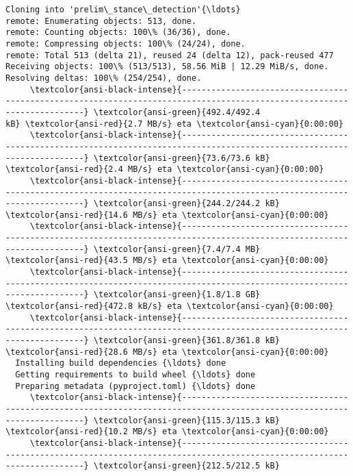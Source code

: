 \documentclass[11pt]{article}
\begin{document}
    \begin{Verbatim}[commandchars=\\\{\}]
Cloning into 'prelim\_stance\_detection'{\ldots}
remote: Enumerating objects: 513, done.
remote: Counting objects: 100\% (36/36), done.
remote: Compressing objects: 100\% (24/24), done.
remote: Total 513 (delta 21), reused 24 (delta 12), pack-reused 477
Receiving objects: 100\% (513/513), 58.56 MiB | 12.29 MiB/s, done.
Resolving deltas: 100\% (254/254), done.
     \textcolor{ansi-black-intense}{------------------------------------------------------------------------------------------------------------------------} \textcolor{ansi-green}{492.4/492.4
kB} \textcolor{ansi-red}{2.7 MB/s} eta \textcolor{ansi-cyan}{0:00:00}
     \textcolor{ansi-black-intense}{------------------------------------------------------------------------------------------------------------------------} \textcolor{ansi-green}{73.6/73.6 kB}
\textcolor{ansi-red}{2.4 MB/s} eta \textcolor{ansi-cyan}{0:00:00}
     \textcolor{ansi-black-intense}{------------------------------------------------------------------------------------------------------------------------} \textcolor{ansi-green}{244.2/244.2 kB}
\textcolor{ansi-red}{14.6 MB/s} eta \textcolor{ansi-cyan}{0:00:00}
     \textcolor{ansi-black-intense}{------------------------------------------------------------------------------------------------------------------------} \textcolor{ansi-green}{7.4/7.4 MB}
\textcolor{ansi-red}{43.5 MB/s} eta \textcolor{ansi-cyan}{0:00:00}
     \textcolor{ansi-black-intense}{------------------------------------------------------------------------------------------------------------------------} \textcolor{ansi-green}{1.8/1.8 GB}
\textcolor{ansi-red}{472.8 kB/s} eta \textcolor{ansi-cyan}{0:00:00}
     \textcolor{ansi-black-intense}{------------------------------------------------------------------------------------------------------------------------} \textcolor{ansi-green}{361.8/361.8 kB}
\textcolor{ansi-red}{28.6 MB/s} eta \textcolor{ansi-cyan}{0:00:00}
  Installing build dependencies {\ldots} done
  Getting requirements to build wheel {\ldots} done
  Preparing metadata (pyproject.toml) {\ldots} done
     \textcolor{ansi-black-intense}{------------------------------------------------------------------------------------------------------------------------} \textcolor{ansi-green}{115.3/115.3 kB}
\textcolor{ansi-red}{10.2 MB/s} eta \textcolor{ansi-cyan}{0:00:00}
     \textcolor{ansi-black-intense}{------------------------------------------------------------------------------------------------------------------------} \textcolor{ansi-green}{212.5/212.5 kB}

\end{Verbatim}
\end{document}

